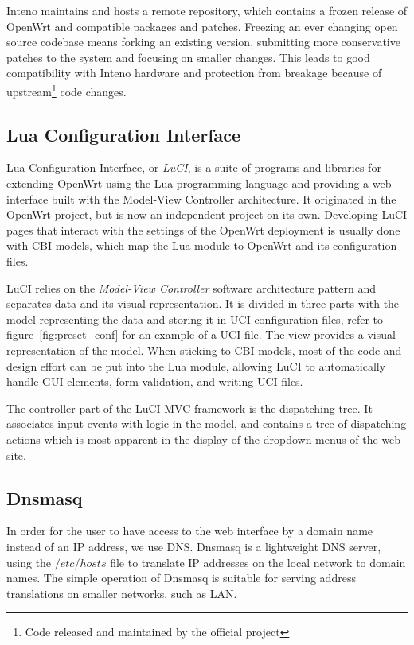\documentclass[a4paper,11pt,makeidx]{kth-bcs}
\begin{document}
Inteno maintains and hosts a remote repository, which contains a frozen release of OpenWrt and compatible packages and patches.
Freezing an ever changing open source codebase means forking an existing version, submitting more conservative patches to the system and focusing on smaller changes.
This leads to good compatibility with Inteno hardware and protection from breakage because of upstream\footnote{Code released and maintained by the official project} code changes.

\subsection{Lua Configuration Interface}\label{sec:LuCI}
Lua Configuration Interface, or \emph{LuCI}, is a suite of programs and libraries for extending OpenWrt using the Lua programming language and providing a web interface built with the Model-View Controller architecture.
It originated in the OpenWrt project, but is now an independent project on its own.
Developing LuCI pages that interact with the settings of the OpenWrt deployment is usually done with CBI models, which map the Lua module to OpenWrt and its configuration files.

LuCI relies on the \emph{Model-View Controller} software architecture pattern and separates data and its visual representation.
It is divided in three parts with the model representing the data and storing it in UCI configuration files, refer to figure~\ref{fig:preset_conf} for an example of a UCI file.
The view provides a visual representation of the model.
When sticking to CBI models, most of the code and design effort can be put into the Lua module, allowing LuCI to automatically handle GUI elements, form validation, and writing UCI files.

The controller part of the LuCI MVC framework is the dispatching tree.
It associates input events with logic in the model, and contains a tree of dispatching actions which is most apparent in the display of the dropdown menus of the web site.

\subsection{Dnsmasq}
In order for the user to have access to the web interface by a domain name instead of an IP address, we use DNS.
Dnsmasq is a lightweight DNS server, using the $/etc/hosts$ file to translate IP addresses on the local network to domain names.\cite{dnsmasq}
The simple operation of Dnsmasq is suitable for serving address translations on smaller networks, such as LAN.
\end{document}
